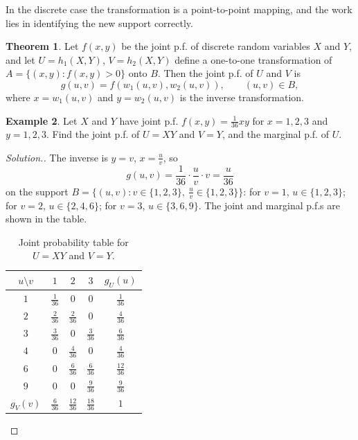 \documentclass[12pt,a4paper]{report}
\theoremstyle{definition}
\newtheorem{thm}{Theorem}[section]
\newtheorem{example}[thm]{Example}
\theoremstyle{plain}
\newenvironment{solution}
  {\renewcommand{\qedsymbol}{}\begin{proof}[\textit{Solution}.]}
  {\end{proof}}
\begin{document}
In the discrete case the transformation is a point-to-point mapping, and the
work lies in identifying the new support correctly.

\begin{thm}
\label{thm:transdiscbiv}
Let $f(x,y)$ be the joint p.f. of discrete random variables $X$ and $Y$, and let
$U = h_1(X,Y)$, $V = h_2(X,Y)$ define a one-to-one transformation of
$A = \{(x,y) : f(x,y) > 0\}$ onto $B$. Then the joint p.f. of $U$ and $V$ is
\[g(u,v) = f(w_1(u,v), w_2(u,v)) ,\qquad (u,v)\in B ,\]
where $x = w_1(u,v)$ and $y = w_2(u,v)$ is the inverse transformation.
\end{thm}

\begin{example}
\label{ex:discreteproduct}
Let $X$ and $Y$ have joint p.f. $f(x,y) = \frac{1}{36}xy$ for $x = 1, 2, 3$ and
$y = 1, 2, 3$. Find the joint p.f. of $U = XY$ and $V = Y$, and the marginal p.f.
of $U$.
\end{example}

\begin{solution}
The inverse is $y = v$, $x = \frac{u}{v}$, so
\[g(u,v) = \frac{1}{36} \cdot\frac{u}{v}\cdot v = \frac{u}{36}\]
on the support $B = \{(u,v) : v \in \{1,2,3\},\ \frac{u}{v} \in \{1,2,3\}\}$:
for $v = 1$, $u\in\{1,2,3\}$; for $v = 2$, $u\in\{2,4,6\}$; for $v = 3$,
$u\in\{3,6,9\}$. The joint and marginal p.f.s are shown in the table.
\begin{table}[H]
\centering
\renewcommand{\arraystretch}{1.4}
\begin{tabular}{|c|ccc|c|}
\hline
$u \setminus v$ & $1$ & $2$ & $3$ & $g_U(u)$ \\ \hline
$1$ & $\frac{1}{36}$ & $0$ & $0$ & $\frac{1}{36}$ \\
$2$ & $\frac{2}{36}$ & $\frac{2}{36}$ & $0$ & $\frac{4}{36}$ \\
$3$ & $\frac{3}{36}$ & $0$ & $\frac{3}{36}$ & $\frac{6}{36}$ \\
$4$ & $0$ & $\frac{4}{36}$ & $0$ & $\frac{4}{36}$ \\
$6$ & $0$ & $\frac{6}{36}$ & $\frac{6}{36}$ & $\frac{12}{36}$ \\
$9$ & $0$ & $0$ & $\frac{9}{36}$ & $\frac{9}{36}$ \\ \hline
$g_V(v)$ & $\frac{6}{36}$ & $\frac{12}{36}$ & $\frac{18}{36}$ & $1$ \\ \hline
\end{tabular}
\caption{Joint probability table for $U = XY$ and $V = Y$.}
\label{tab:discreteproduct}
\end{table}
\end{solution}
\end{document}

